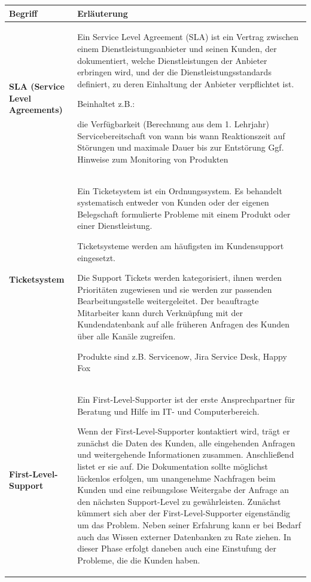 \documentclass[10pt]{article}
\begin{document}
\begin{flushleft}
\begin{longtable}{|p{}|p{}|}
        \hline
        
        \textbf{Begriff} & \textbf{Erläuterung} \\\hline

        \textbf{SLA (Service Level Agreements)} &

        Ein Service Level Agreement (SLA) ist ein Vertrag zwischen einem Dienstleistungsanbieter und seinen Kunden, der dokumentiert, welche Dienstleistungen der Anbieter erbringen wird, und der die Dienstleistungsstandards definiert, zu deren Einhaltung der Anbieter verpflichtet ist.

        Beinhaltet z.B.:
        \begin{outline}
            \1 die Verfügbarkeit (Berechnung aus dem 1. Lehrjahr)
            \1 Servicebereitschaft von wann bis wann
            \1 Reaktionszeit auf Störungen und maximale Dauer bis zur Entstörung
            \1 Ggf. Hinweise zum Monitoring von Produkten
        \end{outline}
        \\\hline

        \textbf{Ticketsystem} & 
        Ein Ticketsystem ist ein Ordnungssystem. Es behandelt systematisch entweder von Kunden oder der eigenen Belegschaft formulierte Probleme mit einem Produkt oder einer Dienstleistung.
        
        Ticketsysteme werden am häufigsten im Kundensupport eingesetzt.
        
        Die Support Tickets werden kategorisiert, ihnen werden Prioritäten zugewiesen und sie werden zur passenden Bearbeitungsstelle weitergeleitet. Der beauftragte Mitarbeiter kann durch Verknüpfung mit der Kundendatenbank auf alle früheren Anfragen des Kunden über alle Kanäle zugreifen.
        
        Produkte sind z.B. Servicenow, Jira Service Desk, Happy Fox
        \\\hline

        \textbf{First-Level-Support} &
        Ein First-Level-Supporter ist der erste Ansprechpartner für Beratung und Hilfe im IT- und Computerbereich.
        
        Wenn der First-Level-Supporter kontaktiert wird, trägt er zunächst die Daten des Kunden, alle eingehenden Anfragen und weitergehende Informationen zusammen. Anschließend listet er sie auf. Die Dokumentation sollte möglichst lückenlos erfolgen, um unangenehme Nachfragen beim Kunden und eine reibungslose Weitergabe der Anfrage an den nächsten Support-Level zu gewährleisten. Zunächst kümmert sich aber der First-Level-Supporter eigenständig um das Problem. Neben seiner Erfahrung kann er bei Bedarf auch das Wissen externer Datenbanken zu Rate ziehen. In dieser Phase erfolgt daneben auch eine Einstufung der Probleme, die die Kunden haben.
        \\\hline


\end{longtable}
\end{flushleft}
\end{document}
